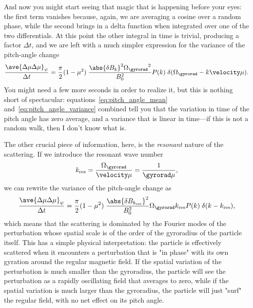 And now you might start seeing that magic that is happening before your eyes: the
first term vanishes because, again, we are averaging a cosine over a random phase,
while the second brings in a delta function when integrated over one of the two differentials. At this
point the other integral in time is trivial, producing a factor $\Delta t$,
and we are left with a much simpler expression for the variance of the pitch-angle
change
\begin{align}\label{eq:pitch_angle_variance}
  \frac{\ave{\Delta \mu \Delta \mu}_\psi}{\Delta t} =
  \frac{\pi}{2} (1 - \mu^2) \; \frac{\abs{\delta B_k}^2 {\Omega_\gyrorad}^2}{B_0^2} P(k)
  \; \delta(\Omega_\gyrorad - k\velocity\mu).
\end{align}
You might need a few more seconds in order to realize it, but this is nothing short
of spectacular: equations~\eqref{eq:pitch_angle_mean} and~\eqref{eq:pitch_angle_variance}
combined tell you that the variation in time of the pitch angle has zero average, and
a variance that is linear in time---if this is not a random walk, then I don't know what is.

The other crucial piece of information, here, is the \emph{resonant} nature of the
scattering. If we introduce the resonant wave number
\begin{align*}
  k_\text{res} = \frac{\Omega_\gyrorad}{\velocity\mu} = \frac{1}{\gyrorad \mu},
\end{align*}
we can rewrite the variance of the pitch-angle change as
\begin{align*}
  \frac{\ave{\Delta \mu \Delta \mu}_\psi}{\Delta t} =
  \frac{\pi}{2} (1 - \mu^2) \; \frac{\abs{\delta B_{k_\text{res}}}^2}{B_0^2}
  \Omega_\gyrorad k_\text{res} P(k) \; \delta(k - k_\text{res}),
\end{align*}
which means that the scattering is dominated by the Fourier modes of the perturbation
whose spatial scale is of the order of the gyroradius of the particle itself. This has
a simple physical interpretation: the particle is effectively scattered when it encounters
a perturbation that is "in phase" with its own gyration around the regular magnetic field.
If the spatial variation of the perturbation is much smaller than the gyroradius,
the particle will see the perturbation as a rapidly oscillating field that averages to zero,
while if the spatial variation is much larger than the gyroradius, the particle will
just "surf" the regular field, with no net effect on its pitch angle.


